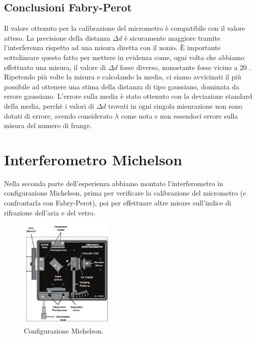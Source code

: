 \documentclass[letterpaper,12pt]{article}
\begin{document}
\subsection{Conclusioni Fabry-Perot}
Il valore ottenuto per la calibrazione del micrometro è compatibile con il valore atteso. La precisione della 
distanza $\Delta d$ è sicuramente maggiore tramite l'interferenza rispetto ad una misura diretta con il nonio.
È importante sottolineare questo fatto per mettere in evidenza come, ogni volta che abbiamo effettuato una misura, 
il valore di $\Delta d$ fosse diverso, nonostante fosse vicino a 20 . Ripetendo più volte
la misura e calcolando la media, ci siamo avvicinati il più possibile ad ottenere una stima della distanza di tipo 
gaussiano, dominata da errore gaussiano. L'errore sulla media è stato ottenuto con la deviazione standard della media, 
perchè i valori di $\Delta d$ trovati in ogni singola misurazione non sono dotati di errore, avendo considerato $\lambda$
come nota e non essendoci errore sulla misura del numero di frange.\\

\newpage
\section{Interferometro Michelson}
Nella seconda parte dell'esperienza abbiamo montato l'interferometro in configurazione Michelson, prima per verificare 
la calibrazione del micrometro (e confrontarla con Fabry-Perot), poi per effettuare altre misure sull'indice di rifrazione
dell'aria e del vetro.
\begin{figure}[h]
    \centering
    \includegraphics[width=0.4\textwidth]{Michelson_aria.png}
    \caption{Configurazione Michelson.}
    \label{fig:michelson config}
\end{figure}
\end{document}
